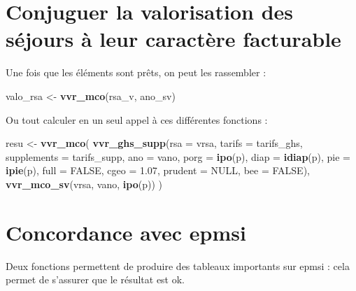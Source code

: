 \documentclass[]{book}
\newenvironment{Shaded}{\begin{snugshade}}{\end{snugshade}}
\newcommand{\DataTypeTok}[1]{\textcolor[rgb]{0.13,0.29,0.53}{#1}}
\newcommand{\FloatTok}[1]{\textcolor[rgb]{0.00,0.00,0.81}{#1}}
\newcommand{\KeywordTok}[1]{\textcolor[rgb]{0.13,0.29,0.53}{\textbf{#1}}}
\newcommand{\NormalTok}[1]{#1}
\newcommand{\OtherTok}[1]{\textcolor[rgb]{0.56,0.35,0.01}{#1}}
\newcommand{\StringTok}[1]{\textcolor[rgb]{0.31,0.60,0.02}{#1}}
\begin{document}
\hypertarget{conjuguer-la-valorisation-des-sejours-a-leur-caractere-facturable}{%
\section{Conjuguer la valorisation des séjours à leur caractère facturable}\label{conjuguer-la-valorisation-des-sejours-a-leur-caractere-facturable}}

Une fois que les éléments sont prêts, on peut les rassembler :

\begin{Shaded}
\begin{Highlighting}[]
\NormalTok{valo_rsa <-}\StringTok{ }\KeywordTok{vvr_mco}\NormalTok{(rsa_v, ano_sv)}
\end{Highlighting}
\end{Shaded}

Ou tout calculer en un seul appel à ces différentes fonctions :

\begin{Shaded}
\begin{Highlighting}[]
\NormalTok{resu <-}\StringTok{ }\KeywordTok{vvr_mco}\NormalTok{(}
\KeywordTok{vvr_ghs_supp}\NormalTok{(}\DataTypeTok{rsa =}\NormalTok{ vrsa, }
             \DataTypeTok{tarifs =}\NormalTok{ tarifs_ghs, }
             \DataTypeTok{supplements =}\NormalTok{  tarifs_supp, }
             \DataTypeTok{ano =}\NormalTok{ vano, }
             \DataTypeTok{porg =} \KeywordTok{ipo}\NormalTok{(p), }
             \DataTypeTok{diap =} \KeywordTok{idiap}\NormalTok{(p), }
             \DataTypeTok{pie =} \KeywordTok{ipie}\NormalTok{(p), }
             \DataTypeTok{full =} \OtherTok{FALSE}\NormalTok{,}
             \DataTypeTok{cgeo =} \FloatTok{1.07}\NormalTok{, }
             \DataTypeTok{prudent =} \OtherTok{NULL}\NormalTok{,}
             \DataTypeTok{bee =} \OtherTok{FALSE}\NormalTok{),}
\KeywordTok{vvr_mco_sv}\NormalTok{(vrsa, vano, }\KeywordTok{ipo}\NormalTok{(p))}
\NormalTok{)}
\end{Highlighting}
\end{Shaded}

\hypertarget{concordance-avec-epmsi}{%
\section{Concordance avec epmsi}\label{concordance-avec-epmsi}}

Deux fonctions permettent de produire des tableaux importants sur epmsi : cela permet de s'assurer que le résultat est ok.
\end{document}
